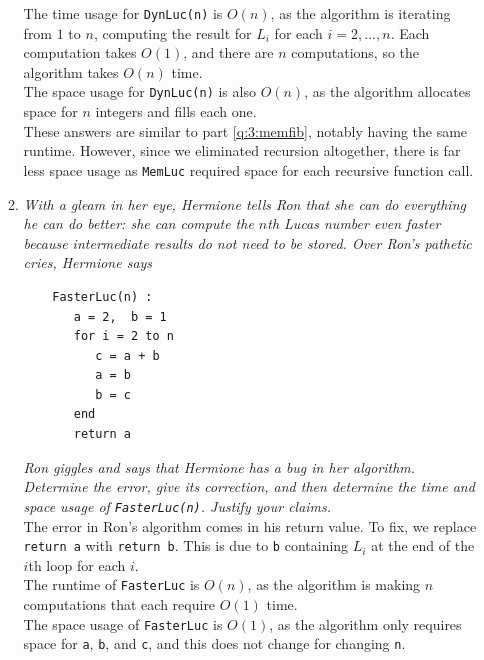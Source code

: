 \documentclass[12pt]{article}
\begin{document}
\begin{enumerate}
\begin{enumerate}
	The time usage for {\tt DynLuc(n)} is $O(n)$, as the algorithm is iterating from $1$ to $n$, computing the result for $L_i$ for each $i=2,...,n$. Each computation takes $O(1)$, and there are $n$ computations, so the 
algorithm takes $\boxed{O(n)}$ time.\\
	
	The space usage for {\tt DynLuc(n)} is also $\boxed{O(n)}$, as the algorithm allocates space for $n$ integers and fills each one.\\
	
	These answers are similar to part \eqref{q:3:memfib}, notably having the same runtime. However, since we eliminated recursion altogether, there is far less space usage as {\tt MemLuc} required space for each recursive 
function call.

    \newpage
	\item\textit{With a gleam in her eye, Hermione tells Ron that she can do everything he can do better: she can compute the $n$th Lucas number even faster because intermediate results do not need to be stored. Over Ron's 
pathetic cries, Hermione says}
	\begin{small}
	\begin{verbatim}
	FasterLuc(n) :
	   a = 2,  b = 1
	   for i = 2 to n
	      c = a + b
	      a = b
	      b = c
	   end
	   return a
	\end{verbatim}
	\end{small}

	\textit{Ron giggles and says that Hermione has a bug in her algorithm. Determine the error, give its correction, and then determine the time and space usage of {\tt FasterLuc(n)}. Justify your claims.}\\
	
	The error in Ron's algorithm comes in his return value. To fix, we replace {\tt return a} with {\tt return b}. This is due to {\tt b} containing $L_i$ at the end of the $i$th loop for each $i$.\\
	
	The runtime of {\tt FasterLuc} is $\boxed{O(n)}$, as the algorithm is making $n$ computations that each require $O(1)$ time.\\
	
	The space usage of {\tt FasterLuc} is $\boxed{O(1)}$, as the algorithm only requires space for {\tt a}, {\tt b}, and {\tt c}, and this does not change for changing {\tt n}.
    
    	

\end{enumerate}
\end{enumerate}
\end{document}
